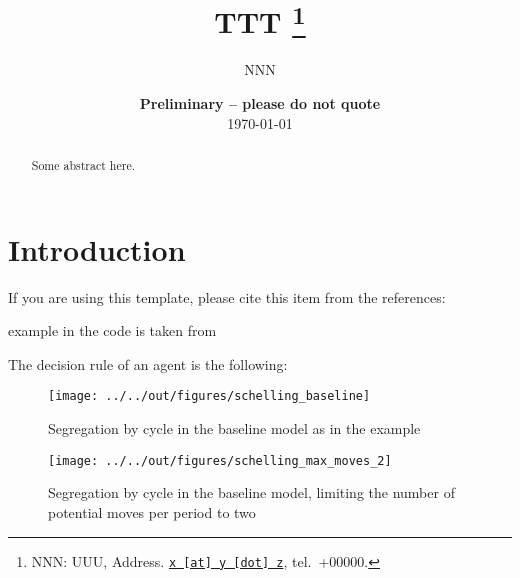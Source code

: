 \documentclass[11pt, a4paper, leqno]{article}
\begin{document}
\title{TTT
\thanks{NNN: UUU, Address. \href{mailto:x@y.z} {\nolinkurl{x [at] y [dot] z}}, tel.~+00000.}
}

\author{NNN
}

\date{
{\bf Preliminary -- please do not quote} 
\\[1ex] 
\today
}

\maketitle


\begin{abstract}
	Some abstract here.
\end{abstract}
\clearpage

\section{Introduction} %
\label{sec:introduction}

If you are using this template, please cite this item from the references: \citet{Gaudecker13}

\citet{Schelling69} example in the code is taken from \citet{StachurskiSargent13}

The decision rule of an agent is the following:


\begin{figure}
    \caption{Segregation by cycle in the baseline \citet{Schelling69} model as in the \citet{StachurskiSargent13} example}
    
    \texttt{[image: ../../out/figures/schelling\_baseline]}

\end{figure}


\begin{figure}
    \caption{Segregation by cycle in the baseline \citet{Schelling69} model, limiting the number of potential moves per period to two}
    
    \texttt{[image: ../../out/figures/schelling\_max\_moves\_2]}

\end{figure}




\printbibliography

\end{document}
